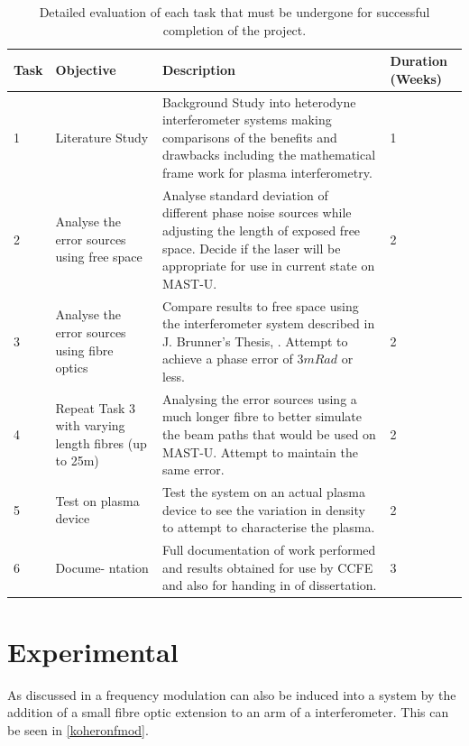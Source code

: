 \documentclass[12pt,a4paper,oneside]{report}
\begin{document}
\begin{center}
\begin{table}[H]
	\setlength\arrayrulewidth{1pt}
    \begin{tabular}{|p{1cm}|p{2.5cm}|p{9cm}|p{1.5cm}|}
    			\hline
    	        Task & Objective & Description & Duration (Weeks)\\
                \hline
                1 & Literature Study & Background Study into heterodyne interferometer systems making comparisons of the benefits and drawbacks including the mathematical frame work for plasma interferometry. & 1\\
                \hline
                2 & Analyse the error sources using free space& Analyse standard deviation of different phase noise sources while adjusting the length of exposed free space. Decide if the laser will be appropriate for use in current state on MAST-U.  & 2\\
                \hline
                3 & Analyse the error sources using fibre optics& Compare results to free space using the interferometer system described in J. Brunner's Thesis, \autocite{Brunner2017}. Attempt to achieve a phase error of 3$mRad$ or less.& 2\\
                \hline
                4 & Repeat Task 3 with varying length fibres (up to 25m)& Analysing the error sources using a much longer fibre to better simulate the beam paths that would be used on MAST-U. Attempt to maintain the same error. & 2\\
                \hline
                5 & Test on plasma device & Test the system on an actual plasma device to see the variation in density to attempt to characterise the plasma. & 2\\
                \hline
                6 & Docume- ntation & Full documentation of work performed and results obtained for use by CCFE and also for handing in of dissertation. & 3\\
        \hline
	\end{tabular}
    \caption{Detailed evaluation of each task that must be undergone for successful completion of the project.}
    \label{tbl:tasks}
\end{table}
\end{center}

\chapter{Experimental}
As discussed in \cite{KoheronAmplitudeKoheron} a frequency modulation can also be induced into a system by the addition of a small fibre optic extension to an arm of a interferometer. This can be seen in \autoref{koheronfmod}.
\end{document}
